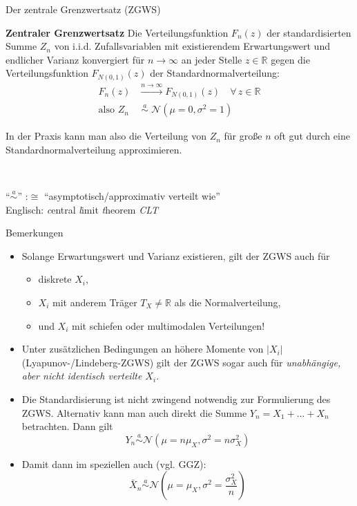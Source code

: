 \documentclass[
  10pt,
  ignorenonframetext,
]{beamer}
\providecommand{\tightlist}{%
  \setlength{\itemsep}{0pt}\setlength{\parskip}{0pt}}
\begin{document}
\begin{frame}{Der zentrale Grenzwertsatz (ZGWS)}
\label{der-zentrale-grenzwertsatz-zgws}
\begin{block}{\textbf{Zentraler Grenzwertsatz}}
\label{zentraler-grenzwertsatz}
Die Verteilungsfunktion \(F_n(z)\) der standardisierten Summe \(Z_n\)
von i.i.d. Zufallsvariablen mit existierendem Erwartungswert und
endlicher Varianz konvergiert für \(n \to \infty\) an jeder Stelle
\(z \in \mathbb{R}\) gegen die Verteilungsfunktion \(F_{N(0, 1)}(z)\)
der Standardnormalverteilung: \begin{align*}
F_n(z) &\stackrel{n \to \infty}{\longrightarrow} F_{N(0,1)}(z)\quad \forall\, z \in \mathbb{R}\\
\text{also } Z_n &\;\stackrel{a}{\sim}\; \mathcal{N}(\mu = 0, \sigma^2 = 1) 
\end{align*}
\end{block}

In der Praxis kann man also die Verteilung von \(Z_n\) für große \(n\)
oft gut durch eine Standardnormalverteilung approximieren.\\
\strut ~

\scriptsize

``\(\stackrel{a}{\sim}\)'' :\(\cong\) ``asymptotisch/approximativ
verteilt wie''\\
Englisch: \emph{c}entral \emph{l}imit \emph{t}heorem \emph{CLT}
\end{frame}

\begin{frame}{Bemerkungen}
\label{bemerkungen-1}
\begin{itemize}
\item
  Solange Erwartungswert und Varianz existieren, gilt der ZGWS auch für

  \begin{itemize}
  \tightlist
  \item
    diskrete \(X_i\),
  \item
    \(X_i\) mit anderem Träger \(T_X \neq \mathbb R\) als die
    Normalverteilung,
  \item
    und \(X_i\) mit schiefen oder multimodalen Verteilungen!
  \end{itemize}
\item
  Unter zusätzlichen Bedingungen an höhere Momente von \(|X_i|\)
  (Lyapunov-/Lindeberg-ZGWS) gilt der ZGWS sogar auch für
  \emph{unabhängige, aber nicht identisch verteilte \(X_i\)}.
\item
  Die Standardisierung ist nicht zwingend notwendig zur Formulierung des
  ZGWS. Alternativ kann man auch direkt die Summe
  \(Y_n = X_1 + ... + X_n\) betrachten. Dann gilt \[
  Y_n \stackrel{a}{\sim} {\mathcal N}(\mu = n\mu_X, \sigma^2 = n\sigma_X^2)
  \]
\item
  Damit dann im speziellen auch (vgl. GGZ):
  \[\bar X_n  \stackrel{a}{\sim} {\mathcal N}\left(\mu = \mu_X, \sigma^2 = \frac{\sigma_X^2}{n}\right)\]
\end{itemize}
\end{frame}
\end{document}
